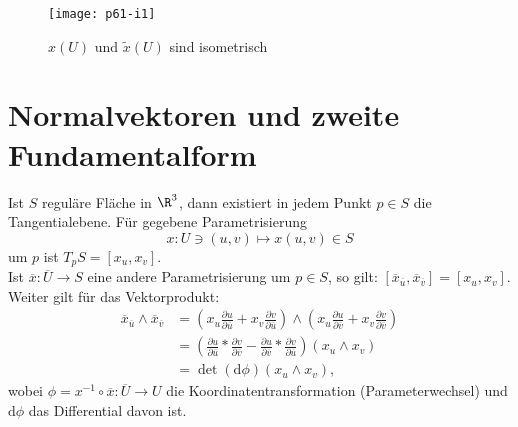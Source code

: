 \begin{figure}[H]
  \texttt{[image: p61-i1]}
  \caption{\( x(U) \) und \( \tilde{x}(U) \) sind isometrisch}
\end{figure}

\section{Normalvektoren und zweite Fundamentalform}

Ist $ S $ reguläre Fläche in $ \R^3 $, dann existiert in jedem Punkt $ p \in S $ die Tangentialebene. Für gegebene Parametrisierung 
\begin{equation*}
  x : U \ni (u,v) \mapsto x(u,v) \in S
\end{equation*}
um $ p $ ist $ T_pS = [x_u,x_v] $. \\
Ist $ \overline{x} : \overline{U} \to S $ eine andere Parametrisierung um $ p \in S $, so gilt: $ [\overline{x}_{\overline{u}},\overline{x}_{\overline{v}}] = [x_u,x_v] $. \\
Weiter gilt für das Vektorprodukt:
\begin{align*}
  \overline{x}_{\overline{u}} \wedge \overline{x}_{\overline{v}} &= \left( x_u\frac{\partial u}{\partial \overline{u}} + x_v\frac{\partial v}{\partial \overline{u}} \right) \wedge \left( x_u\frac{\partial u}{\partial \overline{v}} + x_v\frac{\partial v}{\partial \overline{v}} \right) \\
  &= \left( \frac{\partial u}{\partial \overline{u}}*\frac{\partial v}{\partial \overline{v}} - \frac{\partial u}{\partial \overline{v}}*\frac{\partial v}{\partial \overline{u}} \right) (x_u \wedge x_v) \\
  &= \det(\text{d}\phi)(x_u \wedge x_v)\text{,}
\end{align*}
wobei $ \phi = x^{-1} \circ \overline{x} : \overline{U} \to U $ die Koordinatentransformation (Parameterwechsel) und $ \text{d}\phi $ das Differential davon ist.

